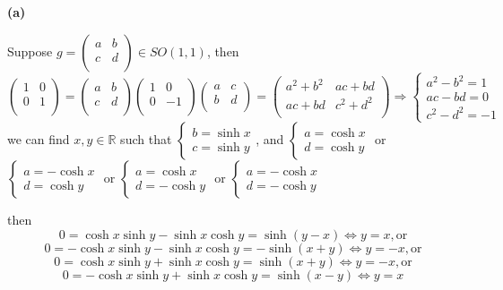 \documentclass[main]{subfiles}
\begin{document}
\textbf{(a)} \par
Suppose $g=\left( {\begin{array}{cc}
   a & b \\
   c & d \\
  \end{array} } \right) \in SO(1,1)$, then 
  $$\left( {\begin{array}{cc}
   1 & 0 \\
   0 & 1 \\
  \end{array} } \right)=\left( {\begin{array}{cc}
   a & b \\
   c & d \\
  \end{array} } \right)\left( {\begin{array}{cc}
   1 & 0 \\
   0 & -1 \\
  \end{array} } \right)\left( {\begin{array}{cc}
   a & c \\
   b & d \\
  \end{array} } \right)=\left( {\begin{array}{cc}
   a^2+b^2 & ac+bd \\
   ac+bd & c^2+d^2 \\
  \end{array} } \right)\Rightarrow \begin{cases}
  a^2-b^2=1 \\
  ac-bd=0 \\
  c^2-d^2=-1
  \end{cases}$$
 we can find $x,y\in\mathbb{R}$ such that $\begin{cases}
  b=\sinh{x} \\
  c=\sinh{y}
  \end{cases}$, and $\begin{cases}
  a=\cosh{x} \\
  d=\cosh{y}
  \end{cases}$ or $\begin{cases}
  a=-\cosh{x} \\
  d=\cosh{y}
  \end{cases}$ or $\begin{cases}
  a=\cosh{x} \\
  d=-\cosh{y}
  \end{cases}$ or $\begin{cases}
  a=-\cosh{x} \\
  d=-\cosh{y}
  \end{cases}$ \par
then 
$$0=\cosh{x}\sinh{y}-\sinh{x}\cosh{y}=\sinh{(y-x)}\iff y=x, \text{or}$$
$$0=-\cosh{x}\sinh{y}-\sinh{x}\cosh{y}=-\sinh{(x+y)}\iff y=-x, \text{or}$$
$$0=\cosh{x}\sinh{y}+\sinh{x}\cosh{y}=\sinh{(x+y)}\iff y=-x, \text{or}$$
$$0=-\cosh{x}\sinh{y}+\sinh{x}\cosh{y}=\sinh{(x-y)}\iff y=x$$
\end{document}
